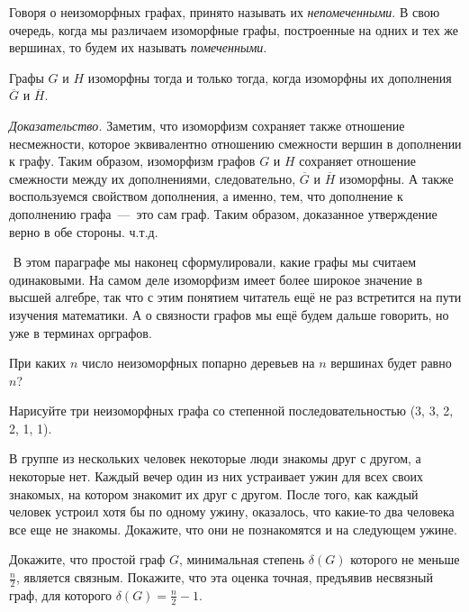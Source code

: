 	Говоря о неизоморфных графах, принято называть их \emph{непомеченными}. В свою очередь, когда мы различаем изоморфные графы, построенные на одних и тех же вершинах, то будем их называть \emph{помеченными}.


\begin{statement}
	Графы $G$ и $H$ изоморфны тогда и только тогда, когда изоморфны их дополнения $\overline{G}$ и $\overline{H}$.
	
	\emph{Доказательство.} Заметим, что изоморфизм сохраняет также отношение несмежности, которое эквивалентно отношению смежности вершин в дополнении к графу. Таким образом, изоморфизм графов $G$ и $H$ сохраняет отношение смежности между их дополнениями, следовательно, $\overline{G}$ и $\overline{H}$ изоморфны. А также воспользуемся свойством дополнения, а именно, тем, что дополнение к дополнению графа~---~это сам граф. Таким образом, доказанное утверждение верно в обе стороны. ч.т.д.
\end{statement}
$ $
\newline
	В этом параграфе мы наконец сформулировали, какие графы мы считаем одинаковыми. На самом деле изоморфизм имеет более широкое значение в высшей алгебре, так что с этим понятием читатель ещё не раз встретится на пути изучения математики. А о связности графов мы ещё будем дальше говорить, но уже в терминах орграфов.

\newpage
{}

\begin{exersize}
	При каких $n$ число неизоморфных попарно деревьев на $n$ вершинах будет равно $n$?
\end{exersize} 

\begin{exersize}
	Нарисуйте три неизоморфных графа со степенной последовательностью (3, 3, 2, 2, 1, 1).
\end{exersize}

\begin{exersize}
	В группе из нескольких человек некоторые люди знакомы друг с другом, а некоторые нет. Каждый вечер один из них устраивает ужин для всех своих знакомых, на котором знакомит их друг с другом. После того, как каждый человек устроил хотя бы по одному ужину, оказалось, что какие-то два человека все еще не знакомы. Докажите, что они не познакомятся и на следующем ужине.
\end{exersize}

\begin{exersize}
	Докажите, что простой граф $G$, минимальная степень $\delta (G)$ которого не меньше $\frac{n}{2}$, является связным. Покажите, что эта оценка точная, предъявив несвязный граф, для которого $\delta (G) = \frac{n}{2} - 1$.
\end{exersize}

